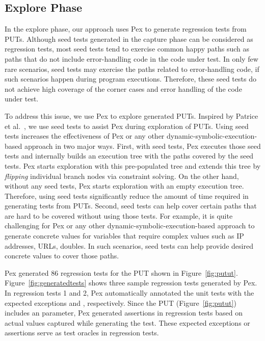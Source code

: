 \subsection{Explore Phase}
\label{sec:explore}

In the explore phase, our approach uses Pex to generate regression tests from PUTs. Although seed tests generated in the capture phase can be considered as regression tests, most seed tests tend to exercise common happy paths such as paths that do not include error-handling code in the code under test. In only few rare scenarios, seed tests may exercise the paths related to error-handling code, if such scenarios happen during program executions. Therefore, these seed tests do not achieve high coverage of the corner cases and error handling of the code under test.

To address this issue, we use Pex to explore generated PUTs. Inspired by Patrice et al.~\cite{patrice08:whitebox}, we use seed tests to assist Pex during exploration of PUTs. Using seed tests increases the effectiveness of Pex or any other dynamic-symbolic-execution-based approach in two major ways. First, with seed tests, Pex executes those seed tests and internally builds an execution tree with the paths covered by the seed tests. Pex starts exploration with this pre-populated tree and extends this tree by \emph{flipping} individual branch nodes via constraint solving. On the other hand, without any seed tests, Pex starts exploration with an empty execution tree. Therefore, using seed tests significantly reduce the amount of time required in generating tests from PUTs. Second, seed tests can help cover certain paths that are hard to be covered without using those tests. For example, it is quite challenging for Pex or any other dynamic-symbolic-execution-based approach to generate concrete values for variables
that require complex values such as IP addresses, URLs, doubles. In such scenarios, seed tests can help provide desired concrete values to cover those paths.

Pex generated $86$ regression tests for the PUT shown in Figure~\ref{fig:putut}. Figure~\ref{fig:generatedtests} shows three sample regression tests generated by Pex. In regression tests 1 and 2, Pex automatically annotated the unit tests with the expected exceptions  and , respectively. Since the PUT (Figure~\ref{fig:putut}) includes an  parameter, Pex generated assertions in regression tests based on actual values captured while 
generating the test. These expected exceptions or assertions serve as test oracles in regression tests.


